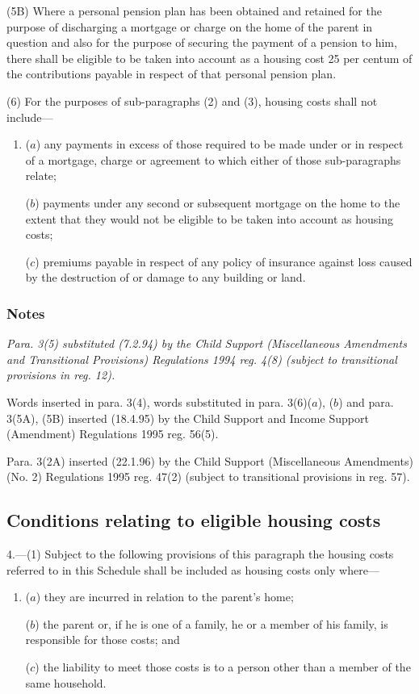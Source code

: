 \documentclass[a4paper]{article}
\newcommand\amendment[1]{\subsubsection*{Notes}{\itshape\frenchspacing\footnotesize #1 \par\goodbreak}}
\begin{document}
(5B) Where a personal pension plan has been obtained and retained for the purpose of discharging a mortgage or charge on the home of the parent in question and also for the purpose of securing the payment of a pension to him, there shall be eligible to be taken into account as a housing cost 25 per centum of the contributions payable in respect of that personal pension plan.

(6) For the purposes of sub-paragraphs (2) and (3), housing costs shall not include—
\begin{enumerate}\item[]
($a$) 
any payments in excess of those required  %
to be made under or in respect of a mortgage, charge or agreement to which either of those sub-paragraphs relate;

($b$) payments under any second or subsequent mortgage on the home to the extent that 
they would not be eligible  %
to be taken into account as housing costs;

($c$) premiums payable in respect of any policy of insurance against loss caused by the destruction of or damage to any building or land.
\end{enumerate}

\amendment{
Para. 3(5) substituted (7.2.94) by the Child Support (Miscellaneous Amendments and Transitional Provisions) Regulations 1994 reg. 4(8) (subject to transitional provisions in reg. 12).

Words inserted in para. 3(4), words substituted in para. 3(6)($a$), ($b$) and para. 3(5A), (5B) inserted (18.4.95) by the Child Support and Income Support (Amendment) Regulations 1995 reg. 56(5).

Para. 3(2A) inserted (22.1.96) by the Child Support (Miscellaneous Amendments) (No. 2) Regulations 1995 reg. 47(2) (subject to transitional provisions in reg. 57).
}

\subsection*{Conditions relating to eligible housing costs}

4.—(1) Subject to the following provisions of this paragraph the housing costs referred to in this Schedule shall be included as housing costs only where—
\begin{enumerate}\item[]
($a$) they are incurred in relation to the parent’s home;

($b$) the parent or, if he is one of a family, he or a member of his family, is responsible for those costs; and

($c$) the liability to meet those costs is to a person other than a member of the same household.
\end{enumerate}
\end{document}
